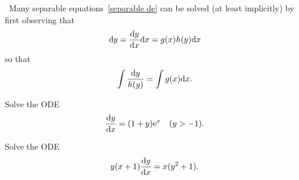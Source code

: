 \begin{remark}\,
Many separable equations~\eqref{separable de} can be solved (at least implicitly) by first observing that
\begin{equation*}
\mathrm{d} y = \frac{\mathrm{d} y}{\mathrm{d} x}\mathrm{d} x = g(x)h(y)\mathrm{d} x
\end{equation*}
so that
\begin{equation*}
\int\frac{\mathrm{d} y}{h(y)} = \int g(x)\mathrm{d} x.
\end{equation*}
\end{remark}

\begin{example}
Solve the ODE
\begin{equation*}
\frac{\mathrm{d} y}{\mathrm{d} x} = (1+y)\mathrm{e}^x\quad (y>-1).
\end{equation*}
\end{example}

\newpage

\begin{example}
Solve the ODE
\begin{equation*}
y(x+1)\frac{\mathrm{d} y}{\mathrm{d} x} = x(y^2+1).
\end{equation*}
\end{example}

